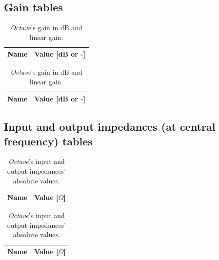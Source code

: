 \subsection{Gain tables}
\begin{table}[h]
    \parbox{.45\linewidth}{
      \centering
      \begin{tabular}{|c|c|}
        \hline
        {\bf Name} & {\bf Value [dB or -]} \\ \hline
        
      \end{tabular}
      \caption{\emph{Ngspice}'s gain in dB and linear gain.}\label{tab:SimGain_Comp}
    }
    \hfill
    \parbox{.45\linewidth}{
      \centering
      \begin{tabular}{|c|c|}
        \hline
        {\bf Name} & {\bf Value [dB or -]} \\ \hline
        
      \end{tabular}
      \caption{\emph{Octave}'s gain in dB and linear gain.}\label{tab:MatGain_Comp}
    }
\end{table}


\subsection{Input and output impedances (at central frequency) tables}
\begin{table}[h]
    \parbox{.45\linewidth}{
      \centering
      \begin{tabular}{|c|c|}
        \hline
        {\bf Name} & {\bf Value [$\Omega$]} \\ \hline
        
      \end{tabular}
      \caption{\emph{Ngspice}'s input and output impedances' absolute values.}\label{tab:SimZ_Comp}
    }
    \hfill
    \parbox{.45\linewidth}{
      \centering
      \begin{tabular}{|c|c|}
        \hline
        {\bf Name} & {\bf Value [$\Omega$]} \\ \hline
        
      \end{tabular}
      \caption{\emph{Octave}'s input and output impedances' absolute values.}\label{tab:MatZ_Comp}
    }
\end{table}

